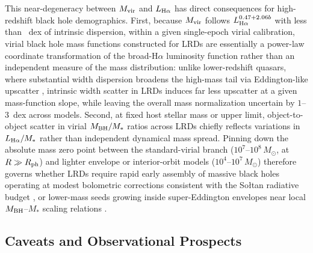 \documentclass[twocolumn,linenumbers]{aastex701}
\newcommand{\Ha}{H$\alpha$}
\newcommand{\LHa}{L_{\rm H\alpha}}
\newcommand{\Rph}{R_{\rm ph}}
\newcommand{\Mvir}{M_{\rm vir}}
\providecommand{\Msun}{M_\odot}
\begin{document}
This near-degeneracy between $\Mvir$ and $\LHa$ has direct consequences for high-redshift black hole demographics.
First, because $\Mvir$ follows $\LHa^{\virL{}+\virW{}b}$ with less than \sigMvir{}~dex of intrinsic dispersion, within a given single-epoch virial calibration, virial black hole mass functions constructed for LRDs \citep[e.g.,][]{Matthee2024,Taylor2025} are essentially a power-law coordinate transformation of the broad-\Ha{} luminosity function rather than an independent measure of the mass distribution: unlike lower-redshift quasars, where substantial width dispersion broadens the high-mass tail via Eddington-like upscatter \citep{Shen2008,Croom2011}, intrinsic width scatter in LRDs induces far less upscatter at a given mass-function slope, while leaving the overall mass normalization uncertain by $1$--$3$~dex across models.
Second, at fixed host stellar mass or upper limit, object-to-object scatter in virial $M_{\rm BH}/M_*$ ratios across LRDs chiefly reflects variations in $\LHa/M_*$ rather than independent dynamical mass spread.
Pinning down the absolute mass zero point between the standard-virial branch ($10^{7}$--$10^{8}\,\Msun$, at $R\gg\Rph$) and lighter envelope or interior-orbit models ($10^{4}$--$10^{7}\,\Msun$) therefore governs whether LRDs require rapid early assembly of massive black holes \citep{InayoshiIchikawa2024,Inayoshi2025} operating at modest bolometric corrections consistent with the So{\l}tan radiative budget \citep{Soltan1982,Greene2026,InayoshiChen2026}, or lower-mass seeds growing inside super-Eddington envelopes near local $M_{\rm BH}$--$M_*$ scaling relations \citep{BegelmanDexter2025,Rusakov2026,Sun2026,Curtis2026}.

\subsection{Caveats and Observational Prospects} \label{sec:prospects}
\end{document}

